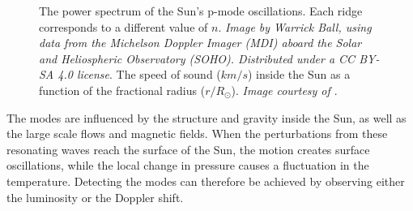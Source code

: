 \documentclass[11pt,a4paper,onecolumn]{report}
\begin{document}
\begin{figure}[t]
  \centering
   \caption{ The power spectrum of the Sun's p-mode
  oscillations. Each ridge corresponds to a different value of \(n\).
  \textit{Image by Warrick Ball, using data from the Michelson Doppler Imager
  (MDI) aboard the Solar and Heliospheric Observatory (SOHO). Distributed under
  a CC BY-SA 4.0 license}.  The speed of sound
  (\(\si{km\per s}\)) inside the Sun as a function of the fractional radius
  (\(\si{r \per R_\odot}\)). \textit{Image courtesy of \citet{bahcall_solar_2000}}.}

\end{figure}

The modes are influenced by the structure and gravity inside the Sun, as well as
the large scale flows and magnetic fields. When the perturbations from these
resonating waves reach the surface of the Sun, the motion creates surface
oscillations, while the local change in pressure causes a fluctuation in the
temperature. Detecting the modes can therefore be achieved by observing either
the luminosity or the Doppler shift.\\
\end{document}
